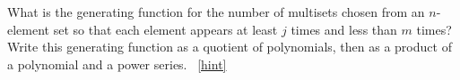 \documentclass{book}
\begin{document}
\setcounter{project}{257}
\addtocounter{project}{-1}
\begin{activity}[]\label{activity-250}
\hypertarget{p-1370}{}%
What is the generating function for the number of multisets chosen from an \(n\)-element set so that each element appears at least \(j\) times and less than \(m\) times? Write this generating function as a quotient of polynomials, then as a product of a polynomial and a power series.%
~\hfill{\tiny\hyperlink{a-257}{[hint]}\hypertarget{q-257}{}}\end{activity}
\end{document}
